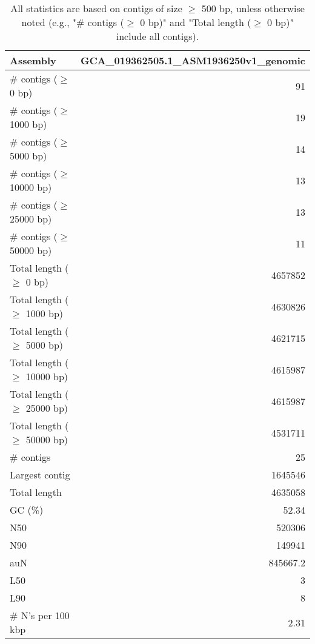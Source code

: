 \documentclass[12pt,a4paper]{article}
\begin{document}
\begin{table}[ht]
\begin{center}
\caption{All statistics are based on contigs of size $\geq$ 500 bp, unless otherwise noted (e.g., "\# contigs ($\geq$ 0 bp)" and "Total length ($\geq$ 0 bp)" include all contigs).}
\begin{tabular}{|l*{1}{|r}|}
\hline
Assembly & GCA\_019362505.1\_ASM1936250v1\_genomic \\ \hline
\# contigs ($\geq$ 0 bp) & 91 \\ \hline
\# contigs ($\geq$ 1000 bp) & 19 \\ \hline
\# contigs ($\geq$ 5000 bp) & 14 \\ \hline
\# contigs ($\geq$ 10000 bp) & 13 \\ \hline
\# contigs ($\geq$ 25000 bp) & 13 \\ \hline
\# contigs ($\geq$ 50000 bp) & 11 \\ \hline
Total length ($\geq$ 0 bp) & 4657852 \\ \hline
Total length ($\geq$ 1000 bp) & 4630826 \\ \hline
Total length ($\geq$ 5000 bp) & 4621715 \\ \hline
Total length ($\geq$ 10000 bp) & 4615987 \\ \hline
Total length ($\geq$ 25000 bp) & 4615987 \\ \hline
Total length ($\geq$ 50000 bp) & 4531711 \\ \hline
\# contigs & 25 \\ \hline
Largest contig & 1645546 \\ \hline
Total length & 4635058 \\ \hline
GC (\%) & 52.34 \\ \hline
N50 & 520306 \\ \hline
N90 & 149941 \\ \hline
auN & 845667.2 \\ \hline
L50 & 3 \\ \hline
L90 & 8 \\ \hline
\# N's per 100 kbp & 2.31 \\ \hline
\end{tabular}
\end{center}
\end{table}
\end{document}
